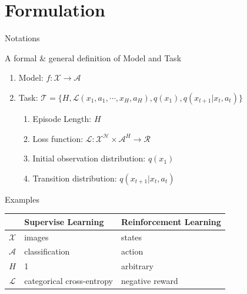 \documentclass[compress]{beamer}
\begin{document}
\section{Formulation}
\begin{frame}[t]{Notations}
    \begin{block}{A formal \& general definition of Model and Task}
        \begin{enumerate}
            \item Model: $f: \mathcal{X}\rightarrow \mathcal{A}$
            \item Task: $\mathcal{T}=\{H,\mathcal{L}(x_1,a_1,\cdots,x_H,a_H),q(x_1),q(x_{t+1}|x_t,a_t)\}$
                \begin{enumerate}
                    \item Episode Length: $H$
                    \item Loss function: $\mathcal{L}: \mathcal{X}^\mathcal{H}\times\mathcal{A}^{H}\rightarrow \mathcal{R}$
                    \item Initial observation distribution: $q(x_1)$
                    \item Transition distribution: $q(x_{t+1}|x_t,a_t)$
                \end{enumerate}
        \end{enumerate}
    \end{block}

    \begin{block}{Examples}
        \begin{center}
            \begin{tabular}{cll}
                \hline
                              & Supervise Learning        & Reinforcement Learning \\ \hline
                $\mathcal{X}$ & images                    & states                 \\ \hline
                $\mathcal{A}$ & classification            & action                 \\ \hline
                $H$           & 1                         & arbitrary              \\ \hline
                $\mathcal{L}$ & categorical cross-entropy & negative reward        \\ \hline
            \end{tabular}
        \end{center}
    \end{block}
\end{frame}
\end{document}
